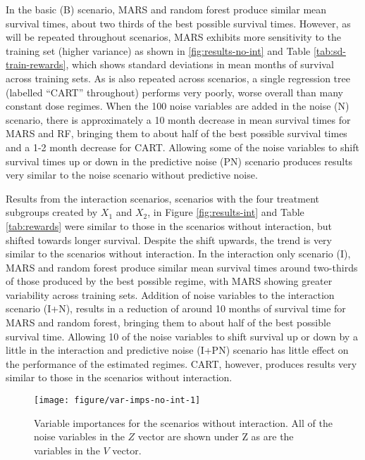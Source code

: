 \documentclass[12pt]{article}
\begin{document}
In the basic (B) scenario, MARS and random forest produce similar mean survival times, about two thirds of the best possible survival times. However, as will be repeated throughout scenarios, MARS exhibits more sensitivity to the training set (higher variance) as shown in \ref{fig:results-no-int} and Table \ref{tab:sd-train-rewards}, which shows standard deviations in mean months of survival across training sets. As is also repeated across scenarios, a single regression tree (labelled ``CART'' throughout) performs very poorly, worse overall than many constant dose regimes. When the 100 noise variables are added in the noise (N) scenario, there is approximately a 10 month decrease in mean survival times for MARS and RF, bringing them to about half of the best possible survival times and a 1-2 month decrease for CART. Allowing some of the noise variables to shift survival times up or down in the predictive noise (PN) scenario produces results very similar to the noise scenario without predictive noise.

Results from the interaction scenarios, scenarios with the four treatment subgroups created by $X_{1}$ and $X_{2}$, in Figure \ref{fig:results-int} and Table \ref{tab:rewards} were similar to those in the scenarios without interaction, but shifted towards longer survival. Despite the shift upwards, the trend is very similar to the scenarios without interaction. In the interaction only scenario (I), MARS and random forest produce similar mean survival times around two-thirds of those produced by the best possible regime, with MARS showing greater variability across training sets. Addition of noise variables to the interaction scenario (I+N), results in a reduction of around 10 months of survival time for MARS and random forest, bringing them to about half of the best possible survival time. Allowing 10 of the noise variables to shift survival up or down by a little in the interaction and predictive noise (I+PN) scenario has little effect on the performance of the estimated regimes. CART, however, produces results very similar to those in the scenarios without interaction.

\begin{figure}[!htbp]
{\centering \texttt{[image: figure/var-imps-no-int-1]}
}
\caption[Variable importances for the scenarios without interaction]{Variable importances for the scenarios without interaction. All of the noise variables in the $Z$ vector are shown under Z as are the variables in the $V$ vector.}\label{fig:var-imps-no-int}
\end{figure}
\end{document}

